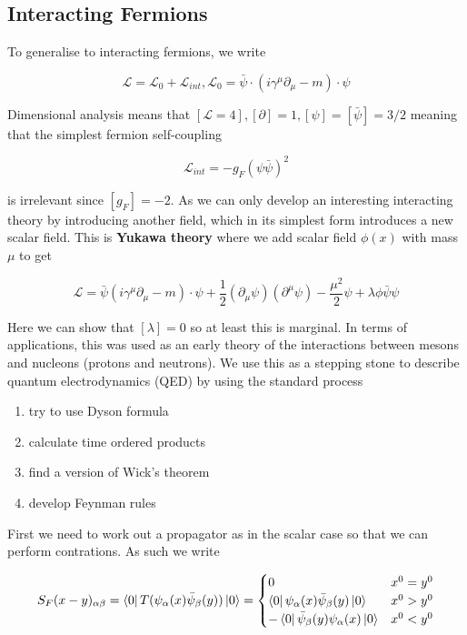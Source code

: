 \documentclass{article}
\theoremstyle{definition}
\begin{document}
\subsection{Interacting Fermions}

To generalise to interacting fermions, we write

$$ \mathcal{L} = \mathcal{L}_0 + \mathcal{L}_{int}, \mathcal{L}_0 = \bar{\psi}
\cdot (i \gamma^\mu \partial_\mu - m) \cdot \psi $$

Dimensional analysis means that $[\mathcal{L} = 4], [\partial] = 1, [\psi] =
[\bar{\psi}] = 3/2$ meaning that the simplest fermion self-coupling

$$ \mathcal{L}_{int} = -g_F (\psi \bar{\psi})^2 $$

is irrelevant since $[g_F] = -2$. As we can only develop an interesting
interacting theory by introducing another field, which in its simplest form
introduces a new scalar field. This is \textbf{Yukawa theory} where we add
scalar field $\phi(x)$ with mass $\mu$ to get

$$ \mathcal{L} = \bar{\psi} (i \gamma^\mu \partial_\mu - m) \cdot \psi +
\frac{1}{2} (\partial_\mu \psi) (\partial^\mu \psi) - \frac{\mu^2}{2} \psi +
\lambda \phi \bar{\psi} \psi $$

Here we can show that $[\lambda] = 0$ so at least this is marginal. In terms of
applications, this was used as an early theory of the interactions between
mesons and nucleons (protons and neutrons). We use this as a stepping stone to
describe quantum electrodynamics (QED) by using the standard process

\begin{enumerate}
\item try to use Dyson formula
\item calculate time ordered products
\item find a version of Wick's theorem
\item develop Feynman rules
\end{enumerate}

First we need to work out a propagator as in the scalar case so that we can
perform contrations. As such we write

$$ S_F(x - y)_{\alpha \beta} = \bra{0} T(\psi_\alpha(x) \bar{\psi}_\beta(y))
\ket{0} =
\begin{cases}
0 & x^0 = y^0 \\
\bra{0} \psi_\alpha(x) \bar{\psi}_\beta(y) \ket{0} & x^0 > y^0 \\
- \bra{0} \bar{\psi}_\beta(y) \psi_\alpha(x) \ket{0} & x^0 < y^0 
\end{cases} $$
\end{document}
